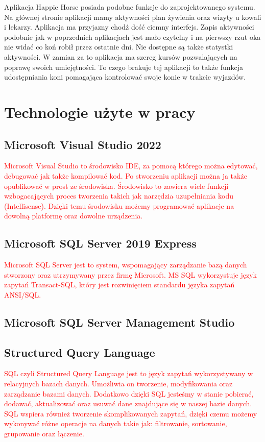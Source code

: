 \documentclass[12pt,oneside]{report}
\begin{document}
Aplikacja Happie Horse posiada podobne funkcje do zaprojektowanego systemu. Na głównej stronie aplikacji mamy aktywności plan żywienia oraz wizyty u kowali i lekarzy. Aplikacja ma przyjazny chodź dość ciemny interfejs. Zapis aktywności podobnie jak w poprzednich aplikacjach jest mało czytelny i na pierwszy rzut oka nie widać co koń robił przez ostatnie dni. Nie dostępne są także statystki aktywności. W zamian za to aplikacja ma szereg kursów pozwalających na poprawę swoich umiejętności. To czego brakuje tej aplikacji to także funkcja udostępniania koni pomagająca kontrolować swoje konie w trakcie wyjazdów.
\chapter{Technologie użyte w pracy}
\section{Microsoft Visual Studio 2022}
\textcolor{red} {Microsoft Visual Studio to środowisko IDE, za pomocą którego można edytować, debugować jak także kompilować kod. Po stworzeniu aplikacji można ja także opublikować w prost ze środowiska. Środowisko to zawiera wiele funkcji wzbogacających proces tworzenia takich jak narzędzia uzupełniania kodu (Intellisense). Dzięki temu środowisku możemy programować aplikacje na dowolną platformę oraz dowolne urządzenia. }
\section{Microsoft SQL Server 2019 Express}
\textcolor{red} {Microsoft SQL Server jest to system, wspomagający zarządzanie bazą danych stworzony oraz utrzymywany przez firmę Microsoft. MS SQL wykorzystuje język zapytań Transact-SQL, który jest rozwinięciem standardu języka zapytań ANSI/SQL.}

\section{Microsoft SQL Server Management Studio}

\section{Structured Query Language}
\textcolor{red} {SQL czyli Structured Query Language jest to język zapytań wykorzystywany w relacyjnych bazach danych. Umożliwia on tworzenie, modyfikowania oraz zarządzanie bazami danych. Dodatkowo dzięki SQL jesteśmy w stanie pobierać, dodawać, aktualizować oraz usuwać dane znajdujące się w naszej bazie danych. SQL wspiera również tworzenie skomplikowanych zapytań, dzięki czemu możemy wykonywać różne operacje na danych takie jak: filtrowanie, sortowanie, grupowanie oraz łączenie.}
\end{document}
